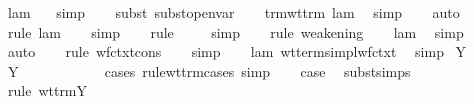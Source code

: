 \begin{isabellebody}
\ lam\ {}\ \isamarkupfalse%
\ simp\isanewline
\ \ \isamarkupfalse%
\ {\isacharparenleft}subst\ subst{\isacharunderscore}open{\isacharunderscore}var{}{\isacharparenright}\isanewline
\ \ \isamarkupfalse%
\ trm{\isacharunderscore}wt{\isacharunderscore}trm\ lam\ \isamarkupfalse%
\ simp\isanewline
\ \ \isamarkupfalse%
\ auto{\isacharbrackleft}{}{\isacharbrackright}\isanewline
\ \ \isamarkupfalse%
\ {\isacharparenleft}rule\ lam{\isacharparenleft}{}{\isacharparenright}{\isacharparenright}\isanewline
\ \ \isamarkupfalse%
\ simp\isanewline
\ \ \isamarkupfalse%
\ {\isacharparenleft}rule\ {}{\isacharparenright}\isanewline
\ \ \isamarkupfalse%
\ simp\isanewline
\ \ \isamarkupfalse%
\ {\isacharparenleft}rule\ weakening{\isacharparenright}\isanewline
\ \ \isamarkupfalse%
\ lam\ \isamarkupfalse%
\ simp\isanewline
\ \ \isamarkupfalse%
\ auto{\isacharbrackleft}{}{\isacharbrackright}\isanewline
\ \ \isamarkupfalse%
\ {\isacharparenleft}rule\ wf{\isacharunderscore}ctxt{\isachardot}cons{\isacharparenright}\isanewline
\ \ \isamarkupfalse%
\ simp\isanewline
\ \ \isamarkupfalse%
\ lam\ wt{\isacharunderscore}terms{\isacharunderscore}impl{\isacharunderscore}wf{\isacharunderscore}ctxt\ \isamarkupfalse%
\ simp\isanewline
{}\isamarkupfalse%
\isanewline
{}\isamarkupfalse%
\ {\isacharparenleft}Y\ {\isasymgamma}{\isacharparenright}\isanewline
\ \ \isamarkupfalse%
\ Y{\isacharparenleft}{}{\isacharparenright}\ \isamarkupfalse%
\ {}{\isacharcolon}\ {\isachardoublequoteopen}{\isasymsigma}\ {\isacharequal}\ {\isacharparenleft}{\isasymgamma}\ {\isasymrightarrow}\ {\isasymgamma}{\isacharparenright}\ {\isasymrightarrow}\ {\isasymgamma}{\isachardoublequoteclose}\ \isamarkupfalse%
\ {\isacharparenleft}cases\ rule{\isacharcolon}wt{\isacharunderscore}trm{\isachardot}cases{\isacharcomma}\ simp{\isacharparenright}\isanewline
\ \ \isamarkupfalse%
\ {\isacharquery}case\ \isamarkupfalse%
\ subst{\isachardot}simps\ {}\isanewline
\ \ \isamarkupfalse%
\ {\isacharparenleft}rule\ wt{\isacharunderscore}trm{\isachardot}Y{\isacharparenright}\isanewline
\ \ \isamarkupfalse%

\end{isabellebody}
